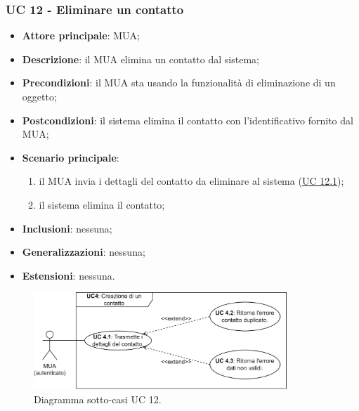 \subsubsection{UC 12 - Eliminare un contatto} \label{sec:UC12}
    \begin{itemize}
        \item \textbf{Attore principale}: MUA;
        \item \textbf{Descrizione}: il MUA elimina un contatto dal sistema;
        \item \textbf{Precondizioni}: il MUA sta usando la funzionalità di eliminazione di un oggetto;
        \item \textbf{Postcondizioni}: il sistema elimina il contatto con l'identificativo fornito dal MUA;
        \item \textbf{Scenario principale}:
            \begin{enumerate}
                \item il MUA invia i dettagli del contatto da eliminare al sistema (\hyperref[sec:UC12.1]{UC 12.1});
                \item il sistema elimina il contatto;
            \end{enumerate}
        \item \textbf{Inclusioni}: nessuna;
        \item \textbf{Generalizzazioni}: nessuna;
        \item \textbf{Estensioni}: nessuna.
    \end{itemize}

\begin{figure}[h]
    \includegraphics[width=0.85\textwidth]{sections/uc_imgs/UC04.X.png}
    \centering
    \caption{Diagramma sotto-casi UC 12.}
\end{figure}

